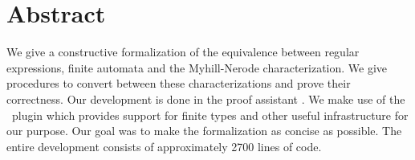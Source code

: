 \chapter*{Abstract}
\label{chap:abstract}


We give a constructive formalization of the equivalence between regular expressions, finite automata and the Myhill-Nerode characterization. 
We give procedures to convert between these characterizations and prove their correctness.
Our development is done in the proof assistant \coq.
We make use of the \ssreflect\ plugin which provides support for finite types and other useful infrastructure for our purpose.
Our goal was to make the formalization as concise as possible.
The entire development consists of approximately 2700 lines of code.
